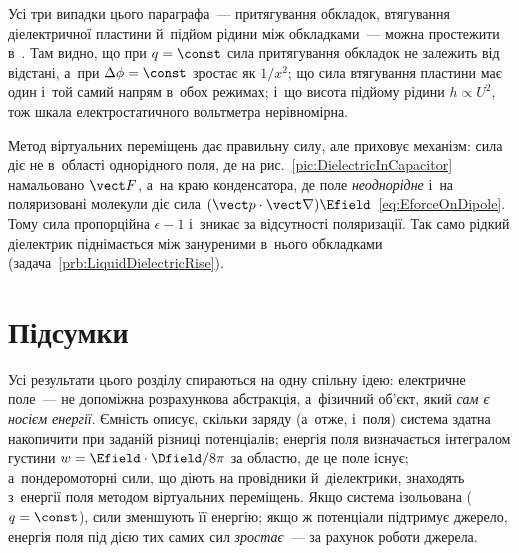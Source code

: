 \begin{Simulation}
Усі три випадки цього параграфа~--- притягування обкладок, втягування діелектричної пластини й~підйом
рідини між обкладками~--- можна простежити в~. Там видно, що при $q=\const$
сила притягування обкладок не залежить від відстані, а~при $\Delta\phi=\const$ зростає як $1/x^2$;
що сила втягування пластини має один і~той самий напрям в~обох режимах; і~що висота підйому
рідини $h\propto U^2$, тож шкала електростатичного вольтметра нерівномірна.
\end{Simulation}

\begin{Attention}
	Метод віртуальних переміщень дає правильну силу, але приховує механізм: сила діє не
	в~області однорідного поля, де на рис.~\ref{pic:DielectricInCapacitor} намальовано
	$\vect F$, а~на краю конденсатора, де поле \emph{неоднорідне} і~на поляризовані
	молекули діє сила $(\vect p\cdot\vect\nabla)\Efield$~\eqref{eq:EforceOnDipole}. Тому
	сила пропорційна $\epsilon - 1$ і~зникає за відсутності поляризації. Так само рідкий
	діелектрик піднімається між зануреними в~нього обкладками (задача~\ref{prb:LiquidDielectricRise}).
\end{Attention}



\section*{Підсумки}
 {}

Усі результати цього розділу спираються на одну спільну ідею: електричне поле~--- не
допоміжна розрахункова абстракція, а~фізичний об'єкт, який \emph{сам є носієм енергії}.
Ємність описує, скільки заряду (а~отже, і~поля) система здатна накопичити при заданій
різниці потенціалів; енергія поля визначається інтегралом густини $w =
\Efield\cdot\Dfield/8\pi$ за областю, де це поле існує; а~пондеромоторні сили, що діють на
провідники й~діелектрики, знаходять з~енергії поля методом віртуальних переміщень. Якщо
система ізольована ($q = \const$), сили зменшують її енергію; якщо ж потенціали підтримує
джерело, енергія поля під дією тих самих сил \emph{зростає}~--- за рахунок роботи джерела.

